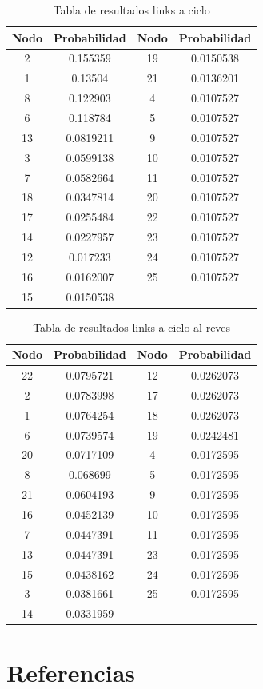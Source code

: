 \begin{table}[H]
\centering
	\begin{tabular}{|c|c|c|c|}
		\hline
		Nodo & Probabilidad & Nodo & Probabilidad \\ \hline
		2    & 0.155359     & 19   & 0.0150538    \\
		1    & 0.13504      & 21   & 0.0136201    \\
		8    & 0.122903     & 4    & 0.0107527    \\
		6    & 0.118784     & 5    & 0.0107527    \\
		13   & 0.0819211    & 9    & 0.0107527    \\
		3    & 0.0599138    & 10   & 0.0107527    \\
		7    & 0.0582664    & 11   & 0.0107527    \\
		18   & 0.0347814    & 20   & 0.0107527    \\
		17   & 0.0255484    & 22   & 0.0107527    \\
		14   & 0.0227957    & 23   & 0.0107527    \\
		12   & 0.017233     & 24   & 0.0107527    \\
		16   & 0.0162007    & 25   & 0.0107527    \\
		15   & 0.0150538    & ~    & ~            \\ \hline
	\end{tabular}
\caption{Tabla de resultados links a ciclo}
\end{table}

\begin{table}[H]
\centering
	\begin{tabular}{|c|c|c|c|}
		\hline
		Nodo & Probabilidad & Nodo & Probabilidad \\ \hline
		22   & 0.0795721    & 12   & 0.0262073    \\
		2    & 0.0783998    & 17   & 0.0262073    \\
		1    & 0.0764254    & 18   & 0.0262073    \\
		6    & 0.0739574    & 19   & 0.0242481    \\
		20   & 0.0717109    & 4    & 0.0172595    \\
		8    & 0.068699     & 5    & 0.0172595    \\
		21   & 0.0604193    & 9    & 0.0172595    \\
		16   & 0.0452139    & 10   & 0.0172595    \\
		7    & 0.0447391    & 11   & 0.0172595    \\
		13   & 0.0447391    & 23   & 0.0172595    \\
		15   & 0.0438162    & 24   & 0.0172595    \\
		3    & 0.0381661    & 25   & 0.0172595    \\
		14   & 0.0331959    & ~    & ~            \\ \hline
	\end{tabular}
\caption{Tabla de resultados links a ciclo al reves}
\end{table}


\section{Referencias}


\newpage


